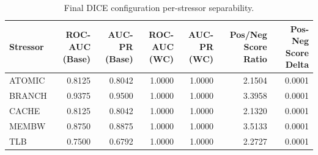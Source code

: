 \begin{table}[t]
\centering
\caption{Final DICE configuration per-stressor separability.}
\label{tab:dice_full_stressor}
\footnotesize
\begin{tabular}{lrrrrrr}
\toprule
Stressor & ROC-AUC (Base) & AUC-PR (Base) & ROC-AUC (WC) & AUC-PR (WC) & Pos/Neg Score Ratio & Pos-Neg Score Delta \\
\midrule
ATOMIC & 0.8125 & 0.8042 & 1.0000 & 1.0000 & 2.1504 & 0.0001 \\
BRANCH & 0.9375 & 0.9500 & 1.0000 & 1.0000 & 3.3958 & 0.0001 \\
CACHE & 0.8125 & 0.8042 & 1.0000 & 1.0000 & 2.1320 & 0.0001 \\
MEMBW & 0.8750 & 0.8875 & 1.0000 & 1.0000 & 3.5133 & 0.0001 \\
TLB & 0.7500 & 0.6792 & 1.0000 & 1.0000 & 2.2727 & 0.0001 \\
\bottomrule
\end{tabular}

\end{table}
